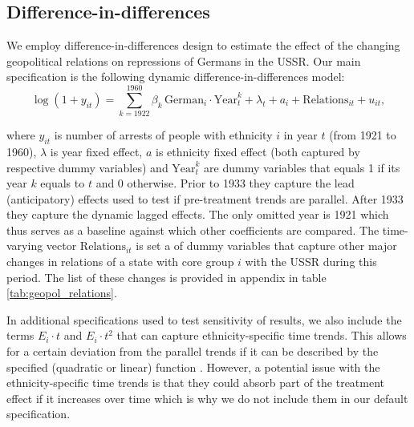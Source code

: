 \subsection{Difference-in-differences} \label{subsec:methodology_did}
We employ difference-in-differences design to estimate the effect of the changing geopolitical relations on repressions of Germans in the USSR. 
Our main specification is the following dynamic difference-in-differences model:
\begin{equation}
 \log\left(1 + y_{it}\right) = \sum_{k= 1922}^{1960} \beta_k \, \text{German}_{i} \cdot \text{Year}_{t}^k +  \lambda_t + a_i +  \text{Relations}_{it}   + u_{it},
 \label{eq:dynamic_did}
\end{equation}

where $y_{it}$ is number of arrests of people with ethnicity $i$ in year $t$ (from 1921 to 1960), $\lambda$ is year fixed effect, $a$ is ethnicity fixed effect (both captured by respective dummy variables) and  $\text{Year}_{t}^k$ are  dummy variables  that equals 1 if its year $k$ equals to $t$ and 0 otherwise.
Prior to  1933 they capture the lead (anticipatory) effects  used to test if pre-treatment trends are parallel. After 1933 they capture the dynamic lagged effects. The only omitted year is 1921 which thus serves as a baseline against which other coefficients are compared. 
The time-varying vector $\text{Relations}_{it}$ is set a of dummy variables that capture other major changes in relations of a state with core group $i$ with the USSR during this period. The list of these changes is provided in appendix in table \ref{tab:geopol_relations}.

In additional specifications used to test sensitivity of results, we also include  the terms $ E_i \cdot t$ and $ E_i \cdot t^2$  that can capture  ethnicity-specific time trends. 
This allows for a certain  deviation from the parallel trends if it can be described by the specified (quadratic or linear) function \citep[chapter 5]{angrist_mostly_2009}. 
However, a potential issue with the ethnicity-specific time trends is that they could absorb part of the treatment effect if it increases over time \citep{meer_effects_2016} which is why we do not include them in our default specification. 

